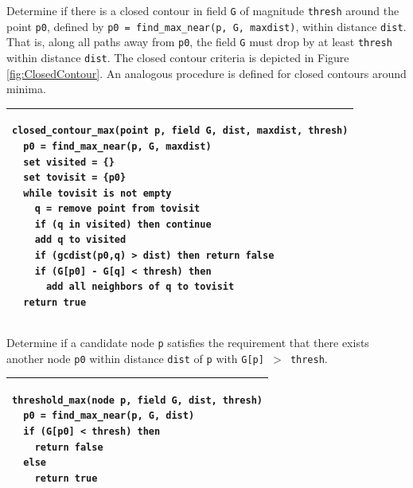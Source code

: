 \documentclass[gmdd, hvmath, online]{copernicus_discussions}
\begin{document}
\begin{algorithm}
\caption{Determine if there is a closed contour in field \texttt{G} of magnitude \texttt{thresh} around the point \texttt{p0}, defined by \texttt{p0 = find\_max\_near(p, G, maxdist)}, within distance \texttt{dist}.  That is, along all paths away from \texttt{p0}, the field \texttt{G} must drop by at least \texttt{thresh} within distance \texttt{dist}.  The closed contour criteria is depicted in Figure \ref{fig:ClosedContour}.  An analogous procedure is defined for closed contours around minima.\ \\} \label{alg:closed_contour_max}
\noindent \begin{tabular}{p{5in}}
\hline \small \begin{verbatim}
closed_contour_max(point p, field G, dist, maxdist, thresh)
  p0 = find_max_near(p, G, maxdist)
  set visited = {}
  set tovisit = {p0}
  while tovisit is not empty
    q = remove point from tovisit
    if (q in visited) then continue
    add q to visited
    if (gcdist(p0,q) > dist) then return false
    if (G[p0] - G[q] < thresh) then
      add all neighbors of q to tovisit
  return true
\end{verbatim} \\
\hline
\end{tabular}
\end{algorithm}

\begin{algorithm}
\caption{Determine if a candidate node \texttt{p} satisfies the requirement that there exists another node \texttt{p0} within distance \texttt{dist} of \texttt{p} with \texttt{G[p] $>$ thresh}.\ \\} \label{alg:threshold_max}
\noindent \begin{tabular}{p{5in}}
\hline \small \begin{verbatim}
threshold_max(node p, field G, dist, thresh)
  p0 = find_max_near(p, G, dist)
  if (G[p0] < thresh) then
    return false
  else
    return true
\end{verbatim} \\
\hline
\end{tabular}
\end{algorithm}
\end{document}
